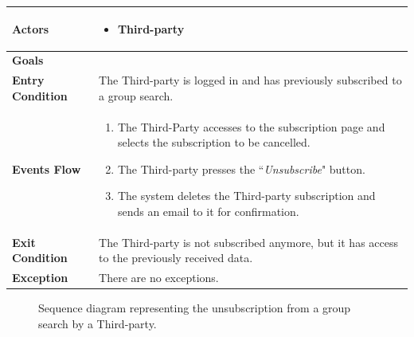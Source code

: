             \begin{table}[H]
            	\centering
                \begin{tabular}{|p{3cm}|p{8.2cm}|}
                    \hline
                    \textbf{Actors} &  \begin{itemize}
                        \item Third-party
                    \end{itemize} \\
                     \hline
                    \textbf{Goals} & \\ 
                     \hline
                    \textbf{Entry Condition} & The Third-party is logged in and has previously subscribed to a group search. \\
                     \hline
                    \textbf{Events Flow} & \begin{enumerate}
                        \item The Third-Party accesses to the subscription page and selects the subscription to be cancelled.
                        \item The Third-party presses the ``\emph{Unsubscribe}" button.
                        \item The system deletes the Third-party subscription and sends an email to it for confirmation.
                    \end{enumerate} \\
                     \hline
                    \textbf{Exit Condition} & The Third-party is not subscribed anymore, but it has access to the previously received data. \\
                     \hline
                    \textbf{Exception} & There are no exceptions. \\
                     \hline
                \end{tabular}  
            \end{table}        
        
            \begin{figure}[H]
                \centering
                \caption{Sequence diagram representing the unsubscription from a group search by a Third-party.}
                \label{fig:Group-request-unsubscription-process-sequence-diagram}
            \end{figure}
        
